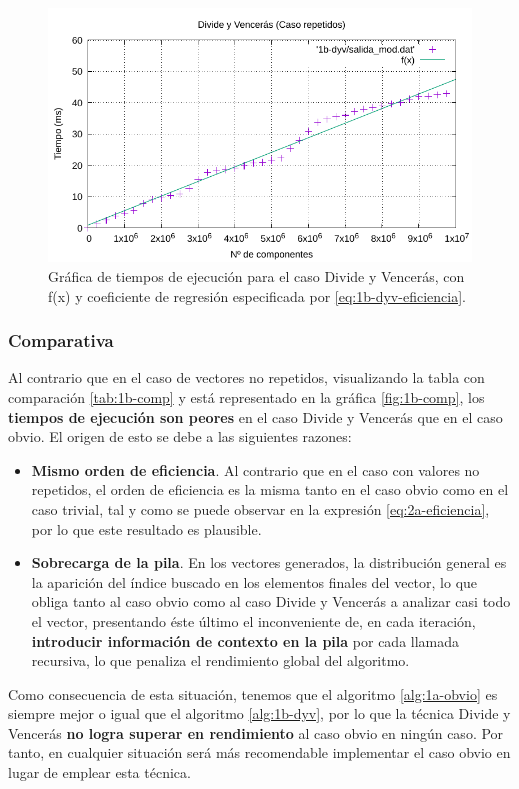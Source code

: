 \begin{figure}
    \centering
    \includegraphics[scale=0.76]{img/e1b-dyv}
    \caption{Gráfica de tiempos de ejecución para el caso Divide y Vencerás, 
    con f(x) y coeficiente de regresión especificada por \ref{eq:1b-dyv-eficiencia}.}
    \label{fig:1b-dyv-graph}
\end{figure}

\subsubsection{Comparativa} \label{sec:1b-comp}

Al contrario que en el caso de vectores no repetidos, visualizando la tabla
con comparación \ref{tab:1b-comp} y está representado en la gráfica \ref{fig:1b-comp}, 
los \textbf{tiempos 
de ejecución son peores} en el caso Divide y
Vencerás que en el caso obvio. El origen de esto se debe a las siguientes
razones:

\begin{itemize}
    \item \textbf{Mismo orden de eficiencia}. Al contrario que en el caso con valores 
    no repetidos, el orden de eficiencia
    es la misma tanto en el caso obvio como en el caso trivial, tal y como se puede
    observar en la expresión \ref{eq:2a-eficiencia}, por lo que este resultado es plausible. 
    \item \textbf{Sobrecarga de la pila}. En los vectores generados, la distribución 
    general es la aparición del índice
    buscado en los elementos finales del vector, lo que obliga tanto al caso obvio como al caso
    Divide y Vencerás a analizar casi todo el vector, presentando éste último el 
    inconveniente de, en cada iteración, \textbf{introducir información de contexto
    en la pila} por cada llamada recursiva, lo que penaliza el rendimiento global del
    algoritmo. 
\end{itemize}

Como consecuencia de esta situación, tenemos que el algoritmo \ref{alg:1a-obvio} es siempre mejor o igual 
que el algoritmo \ref{alg:1b-dyv}, por lo que la técnica Divide y Vencerás \textbf{no logra superar en 
rendimiento} al caso obvio en ningún caso. Por tanto, en cualquier situación será más recomendable
implementar el caso obvio en lugar de emplear esta técnica. 
